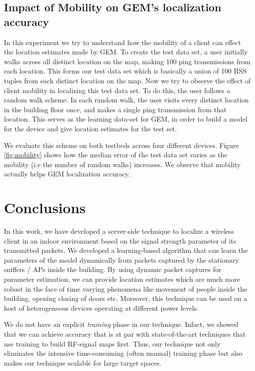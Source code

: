 \documentclass{Localization-PaperWriteupDraft}
\begin{document}
\subsection{Impact of Mobility on GEM's localization accuracy}
\label{subsec:impactofmobilityongemslocalizationaccuracy}

In this experiment we try to understand how the mobility of a client can effect the location estimates made by GEM. To create the test data set, a user initially walks across all distinct location on the map, making 100 ping transmissions from each location. This forms our test data set which is basically a union of 100 RSS tuples from each distinct location on the map.  Now we try to observe the effect of client mobility in localizing this test data set. To do this, the user follows a random walk scheme. In each random walk, the user visits every distinct location in the building floor once, and makes a single ping transmission from that location. This serves as the learning data-set for GEM, in order to build a model for the device and give location estimates for the test set. 

We evaluate this scheme on both testbeds across four different devices. Figure \ref{fig:mobility} shows how the median error of the test data set varies as the mobility (i.e the number of random walks) increases. We observe that mobility actually helps GEM localization accuracy.


\section{Conclusions}
\label{sec:conclusions}

In this work, we have developed a server-side technique to localize a
wireless client in an indoor environment based on the signal strength
parameter of its transmitted packets. We developed a learning-based
algorithm that can learn the parameters of the model
dynamically from packets captured by the stationary sniffers / APs
inside the building. By using dynamic packet captures for parameter
estimation, we can provide location estimates which are much more robust in the face of time
varying phenomena like movement of people inside the building, opening
closing of doors etc. Moreover, this technique can be used on a host of
heterogeneous devices operating at different power levels. 

We do not have an explicit {\it training} phase in our technique.
Infact, we showed that we can achieve accuracy that is at par with state-of-the-art
techniques that use training to build RF-signal maps first. Thus,
our technique not only eliminates the intensive time-consuming (often manual) training phase
but also makes our technique scalable for large target spaces.
\end{document}

